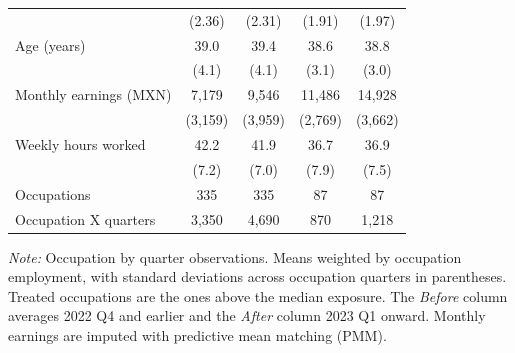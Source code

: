 \begin{table}[H]
\begin{threeparttable}
\begin{tabular}[t]{lcccc}
                                     & (2.36)                      & (2.31)                      & (1.91)    & (1.97)    \\
      \addlinespace[3pt]
      Age (years)                    & 39.0                        & 39.4                        & 38.6      & 38.8      \\
                                     & (4.1)                       & (4.1)                       & (3.1)     & (3.0)     \\
      \addlinespace[3pt]
      Monthly earnings (MXN)         & 7,179                       & 9,546                       & 11,486    & 14,928    \\
                                     & (3,159)                     & (3,959)                     & (2,769)   & (3,662)   \\
      \addlinespace[3pt]
      Weekly hours worked            & 42.2                        & 41.9                        & 36.7      & 36.9      \\
                                     & (7.2)                       & (7.0)                       & (7.9)     & (7.5)     \\
      \midrule
      Occupations                    & 335                         & 335                         & 87        & 87        \\
      Occupation X quarters          & 3,350                       & 4,690                       & 870       & 1,218     \\
      \bottomrule
    \end{tabular}
    \begin{tablenotes}
      \item \textit{Note: } Occupation by quarter observations. Means weighted by occupation employment, with standard deviations across occupation quarters in parentheses. Treated occupations are the ones above the median exposure. The \textit{Before} column averages 2022 Q4 and earlier and the \textit{After} column 2023 Q1 onward. Monthly earnings are imputed with predictive mean matching (PMM).
    \end{tablenotes}
  \end{threeparttable}
\end{table}


